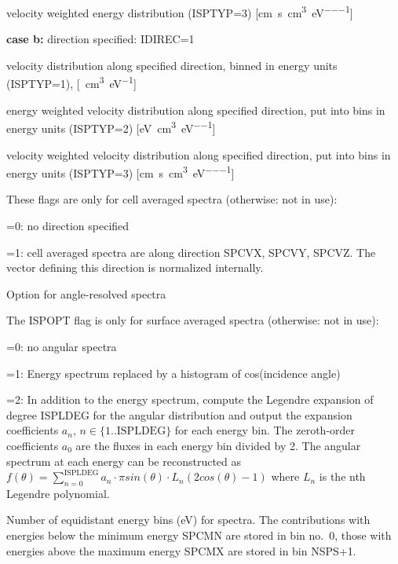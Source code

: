 \begin{description}
        velocity weighted energy distribution (ISPTYP=3)
        [\si{\centi\metre\per\second\per\cubic\centi\metre\per\electronvolt}]

        \textbf{case b:} direction specified: IDIREC=1

        velocity distribution along specified direction, binned in energy units
        (ISPTYP=1), [\si{\per\cubic\centi\metre\per\electronvolt}]

        energy weighted velocity distribution along specified direction, put into bins
        in energy units (ISPTYP=2)
        [\si{\electronvolt\per\cubic\centi\metre\per\electronvolt}]

        velocity weighted velocity distribution along specified direction, put into
        bins in energy units (ISPTYP=3)
        [\si{\centi\metre\per\second\per\cubic\centi\metre\per\electronvolt}]

  \item[IDIREC, SPCVX, SPCVY, SPCVZ]

        These flags are only for cell averaged spectra (otherwise: not in use):

        =0: no direction specified

        =1: cell averaged spectra are along direction SPCVX, SPCVY, SPCVZ.
        The vector defining this direction is normalized internally.

  \item[ISPOPT, ISPLDEG] Option for angle-resolved spectra

        The ISPOPT flag is only for surface averaged spectra (otherwise: not in use):

        =0: no angular spectra

	=1: Energy spectrum replaced by a histogram of cos(incidence angle)

        =2: In addition to the energy spectrum, compute the Legendre expansion of
        degree ISPLDEG for the angular distribution and output the expansion coefficients
        $a_n$, $n \in \{1..\text{ISPLDEG}\}$ for each energy bin. The zeroth-order coefficients
        $a_0$ are the fluxes in each energy bin divided by 2. The angular spectrum at each
        energy can be reconstructed as
        $f(\theta)=\sum_{n=0}^{\text{ISPLDEG}}a_n\cdot\pi sin(\theta)\cdot L_n(2 cos(\theta)-1)$
        where $L_n$ is the nth Legendre polynomial.

  \item[NSPS, SPCMN, SPCMX] Number of equidistant energy bins
        (\si{\electronvolt}) for spectra.
        The contributions with energies below the minimum energy SPCMN are stored in
        bin no.\ 0, those with energies above the maximum energy SPCMX are stored in
        bin NSPS+1.


\end{description}
